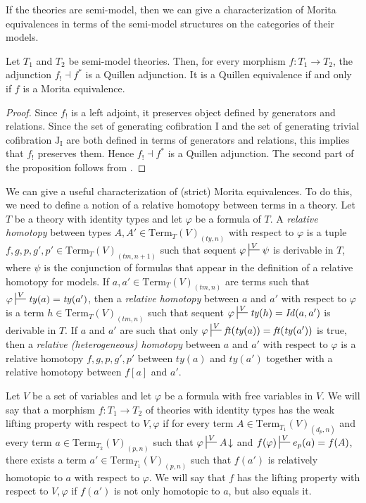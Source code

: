 \documentclass[reqno]{amsart}
\theoremstyle{definition}
\theoremstyle{remark}
\newcommand{\Term}{\mathrm{Term}}
\newcommand{\Id}{\mathit{Id}}
\newcommand{\ft}{\mathit{ft}}
\newcommand{\ty}{\mathit{ty}}
\newcommand{\tm}{\mathit{tm}}
\newcommand{\I}{\mathrm{I}}
\newcommand{\J}{\mathrm{J}}
\numberwithin{figure}{section}
\begin{document}
If the theories are semi-model, then we can give a characterization of Morita equivalences in terms of the semi-model structures on the categories of their models.

\begin{prop}
Let $T_1$ and $T_2$ be semi-model theories.
Then, for every morphism $f : T_1 \to T_2$, the adjunction $f_! \dashv f^*$ is a Quillen adjunction.
It is a Quillen equivalence if and only if $f$ is a Morita equivalence.
\end{prop}
\begin{proof}
Since $f_!$ is a left adjoint, it preserves object defined by generators and relations.
Since the set of generating cofibration $\I$ and the set of generating trivial cofibration $\J_\I$
are both defined in terms of generators and relations, this implies that $f_!$ preserves them.
Hence $f_! \dashv f^*$ is a Quillen adjunction.
The second part of the proposition follows from \cite[Corollary~3.9]{f-model-structures}.
\end{proof}

We can give a useful characterization of (strict) Morita equivalences.
To do this, we need to define a notion of a relative homotopy between terms in a theory.
Let $T$ be a theory with identity types and let $\varphi$ be a formula of $T$.
A \emph{relative homotopy} between types $A,A' \in \Term_T(V)_{(\ty,n)}$ with respect to $\varphi$ is a tuple $f,g,p,g',p' \in \Term_T(V)_{(\tm,n+1)}$
such that sequent $\varphi \sststile{}{V} \psi$ is derivable in $T$, where $\psi$ is the conjunction of formulas that appear in the definition of a relative homotopy for models.
If $a,a' \in \Term_T(V)_{(\tm,n)}$ are terms such that $\varphi \sststile{}{V} \ty(a) = \ty(a')$, then a \emph{relative homotopy} between $a$ and $a'$ with respect to $\varphi$ is a term $h \in \Term_T(V)_{(\tm,n)}$
such that sequent $\varphi \sststile{}{V} \ty(h) = \Id(a,a')$ is derivable in $T$.
If $a$ and $a'$ are such that only $\varphi \sststile{}{V} \ft(\ty(a)) = \ft(\ty(a'))$ is true, then a \emph{relative (heterogeneous) homotopy} between $a$ and $a'$ with respect to $\varphi$
is a relative homotopy $f,g,p,g',p'$ between $\ty(a)$ and $\ty(a')$ together with a relative homotopy between $f[a]$ and $a'$.

Let $V$ be a set of variables and let $\varphi$ be a formula with free variables in $V$.
We will say that a morphism $f : T_1 \to T_2$ of theories with identity types has the weak lifting property with respect to $V,\varphi$ if
for every term $A \in \Term_{T_1}(V)_{(d_p,n)}$ and every term $a \in \Term_{T_2}(V)_{(p,n)}$ such that $\varphi \sststile{}{V} A\!\downarrow$ and $f(\varphi) \sststile{}{V} e_p(a) = f(A)$,
there exists a term $a' \in \Term_{T_1}(V)_{(p,n)}$ such that $f(a')$ is relatively homotopic to $a$ with respect to $\varphi$.
We will say that $f$ has the lifting property with respect to $V,\varphi$ if $f(a')$ is not only homotopic to $a$, but also equals it.
\end{document}
